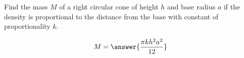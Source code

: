 \documentclass{ximera}
\author{David Guichard \and Neal Koblitz \and H. Jerome Keisler \and Albert Scheller \and Barry Balof \and Mike Wills \and Matthew Carr}
\begin{document}
\begin{exercise}




Find the mass $M$ of a right circular cone of height $h$ and base radius $a$ if the density is proportional to the distance from the base with constant of proportionality $k$.
 
\begin{prompt}
\[
M=\answer{\frac{\pi k h^2 a^2}{12}}
\]
\end{prompt}



\end{exercise}
\end{document}
